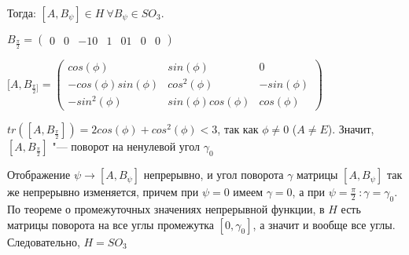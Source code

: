 \documentclass{article}
\begin{document}
Тогда: $[A, B_{\psi}] \in H \  \forall B_{\psi} \in SO_3$.

$B_{\frac{\pi}{2}} = \begin{pmatrix}
0 & 0 & -1
0 & 1 & 0
1 & 0 & 0
\end{pmatrix}$

$[A, B_{\frac{\pi}{2}]} = \begin{pmatrix}
cos(\phi) & sin(\phi) & 0 \\
-cos(\phi)sin(\phi) & cos^2(\phi) & -sin(\phi) \\
-sin^2(\phi) & sin(\phi)cos(\phi) & cos(\phi)
\end{pmatrix}$

$tr([A, B_{\frac{\pi}{2}}]) = 2cos(\phi) + cos^2(\phi) < 3$, так как $\phi \neq 0$ ($A \neq E$). Значит, $[A, B_{\frac{\pi}{2}}]$ "--- поворот на ненулевой угол $\gamma_0$

Отображение $\psi \rightarrow [A, B_{\psi}]$ непрерывно, и угол поворота $\gamma$ матрицы $[A, B_{\psi}]$ так же непрерывно изменяется, причем при $\psi = 0$ имеем $\gamma = 0$, а при $\psi = \frac{\pi}{2} \ :  \gamma = \gamma_0$. По теореме о промежуточных значениях непрерывной функции, в $H$ есть матрицы поворота на все углы промежутка $[0, \gamma_0]$, а значит и вообще все углы. Следовательно, $H = SO_3$
\end{document}
